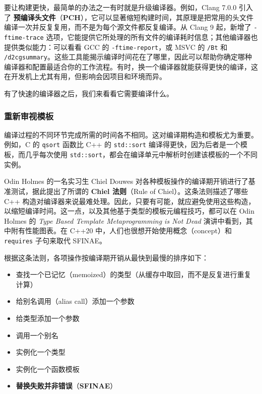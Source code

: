 \label{idx:642}
要让构建更快，最简单的办法之一有时就是升级编译器。例如，Clang 7.0.0 引入了 \textbf{预编译头文件}（\textbf{PCH}），它可以显著缩短构建时间，其原理是把常用的头文件编译一次并反复复用，而不是为每个源文件都反复编译。从 Clang 9 起，新增了 \texttt{-ftime-trace} 选项，它能提供它所处理的所有文件的编译耗时信息；其他编译器也提供类似能力：可以看看 GCC 的 \texttt{-ftime-report}，或 MSVC 的 \texttt{/Bt} 和 \texttt{/\allowbreak{}d2cgsummary}。这些工具能揭示编译时间花在了哪里，因此可以帮助你确定哪种编译器和配置最适合你的工作流程。有时，换一个编译器就能获得更快的编译，这在开发机上尤其有用，但影响会因项目和环境而异。

有了快速的编译器之后，我们来看看它需要编译什么。

\subsubsection{重新审视模板}

编译过程的不同环节完成所需的时间各不相同。这对编译期构造和模板尤为重要。例如，C 的 \texttt{qsort} 函数比 C++ 的 \texttt{std::sort} 编译得更快，因为后者是一个模板，而几乎每次使用 \texttt{std::sort}，都会在编译单元中解析时创建该模板的一个不同实例。

\label{idx:643}
Odin Holmes 的一名实习生 Chiel Douwes 对各种模板操作的编译期开销进行了基准测试，据此提出了所谓的 \textbf{Chiel 法则}（Rule of Chiel）。这条法则描述了哪些 C++ 构造对编译器来说最难处理。因此，只要有可能，就应避免使用这些构造，以缩短编译时间。这一点，以及其他基于类型的模板元编程技巧，都可以在 Odin Holmes 的 \emph{Type Based Template Metaprogramming is Not Dead} 演讲中看到，其中附有性能图表。在 C++20 中，人们也很想开始使用概念（concept）和 \texttt{requires} 子句来取代 SFINAE。

\label{idx:644}
根据这条法则，各项操作按编译期开销从最快到最慢的排序如下：

\begin{itemize}
\item 查找一个已记忆（memoized）的类型（从缓存中取回，而不是反复进行重复计算）
\item 给别名调用（alias call）添加一个参数
\item 给类型添加一个参数
\item 调用一个别名
\item 实例化一个类型
\label{idx:645}
\item 实例化一个函数模板
\item \textbf{替换失败并非错误}（\textbf{SFINAE}）
\end{itemize}

